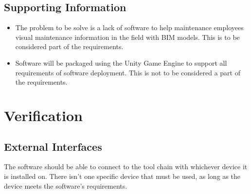 \documentclass[onecolumn, draftclsnofoot,10pt, compsoc]{IEEEtran}
\begin{document}
    \subsection{Supporting Information}
    \begin{itemize}
        \item The problem to be solve is a lack of software to help maintenance employees visual maintenance information in the field with BIM models. This is to be considered part of the requirements.
        \item Software will be packaged using the Unity Game Engine to support all requirements of software deployment. This is not to be considered a part of the requirements.
    \end{itemize}

\newpage

\section{Verification}
    \subsection{External Interfaces}
        The software should be able to connect to the tool chain with whichever device it is installed on. There isn't one specific device that must be used, as long as the device meets the software's requirements.
\end{document}
